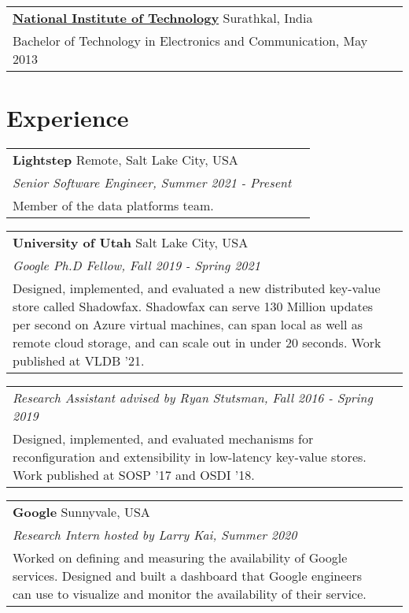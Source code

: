 \documentclass[margin,line]{res}
\begin{document}
\begin{resume}
 \vspace{-7pt}
 \begin{tabular}{@{}p{5.5in}p{4in}}
 {\bf \href{http://www.ece.nitk.ac.in/}{National Institute of
 Technology}} \dotfill Surathkal, India
 \\ {\small Bachelor of Technology in Electronics and Communication, May 2013}
 \end{tabular}

\section{\sc Experience}
\begin{tabular}{@{}p{5.5in}p{4in}}
{\bf Lightstep} \dotfill Remote, Salt Lake City, USA \\
{\small\em Senior Software Engineer, Summer 2021 - Present} \\
{\small Member of the data platforms team.}\\
\end{tabular}

\vspace{-7pt}
\begin{tabular}{@{}p{5.5in}p{4in}}
{\bf University of Utah} \dotfill Salt Lake City, USA \\
{\small\em Google Ph.D Fellow, Fall 2019 - Spring 2021} \\
{\small Designed, implemented, and evaluated a new distributed key-value
store called Shadowfax. Shadowfax can serve 130 Million updates per
second on Azure virtual machines, can span local as well as remote cloud
storage, and can scale out in under 20 seconds. Work published at
VLDB '21.}\\
\end{tabular}

\vspace{-7pt}
\begin{tabular}{@{}p{5.5in}p{4in}}
{\small\em Research Assistant advised by Ryan Stutsman, Fall 2016 -
Spring 2019}\\
{\small Designed, implemented, and evaluated mechanisms for
reconfiguration and extensibility in low-latency key-value stores. Work
published at SOSP '17 and OSDI '18.}
\end{tabular}

\vspace{-7pt}
\begin{tabular}{@{}p{5.5in}p{4in}}
{\bf Google} \dotfill Sunnyvale, USA \\
{\small\em Research Intern hosted by Larry Kai, Summer 2020}\\
{\small Worked on defining and measuring the availability of Google
services. Designed and built a dashboard that Google engineers
can use to visualize and monitor the availability of their service.}
\end{tabular}


\end{resume}
\end{document}
